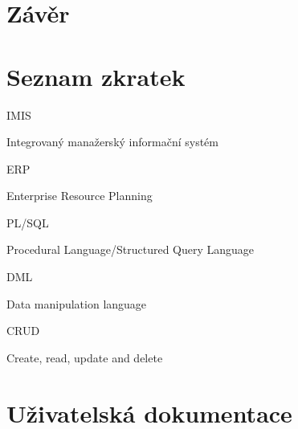 \documentclass{diplomka}
\begin{document}
\chapter{Závěr}

\chapter*{Seznam zkratek} 

\begin{list}{}{\setlength{\leftmargin}{30mm}
\setlength{\labelwidth}{30mm} \setlength{\labelsep}{0mm} }
\item[\parbox{30mm}{IMIS}] Integrovaný manažerský informační systém
\item[\parbox{30mm}{ERP}] Enterprise Resource Planning 
\item[\parbox{30mm}{PL/SQL}] Procedural Language/Structured Query Language
\item[\parbox{30mm}{DML}] Data manipulation language
\item[\parbox{30mm}{CRUD}] Create, read, update and delete
\end{list}

\appendix



\pagestyle{fancy}
\chapter{Uživatelská dokumentace}
\end{document}
